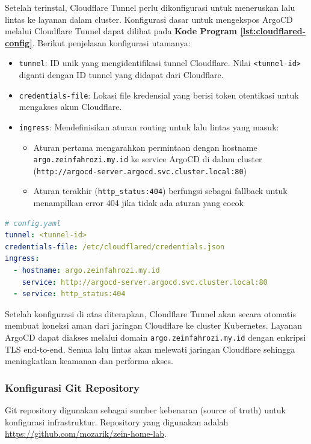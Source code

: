 Setelah terinstal, Cloudflare Tunnel perlu dikonfigurasi untuk meneruskan lalu
lintas ke layanan dalam cluster. Konfigurasi dasar untuk mengekspos ArgoCD
melalui Cloudflare Tunnel dapat dilihat pada \textbf{Kode Program
  \ref{lst:cloudflared-config}}. Berikut penjelasan konfigurasi utamanya:

\begin{itemize}
  \item \texttt{tunnel}: ID unik yang mengidentifikasi tunnel Cloudflare. Nilai \texttt{<tunnel-id>} diganti dengan ID tunnel yang didapat dari Cloudflare.
  \item \texttt{credentials-file}: Lokasi file kredensial yang berisi token otentikasi untuk mengakses akun Cloudflare.
  \item \texttt{ingress}: Mendefinisikan aturan routing untuk lalu lintas yang masuk:
        \begin{itemize}
          \item Aturan pertama mengarahkan permintaan dengan hostname
                \texttt{argo.zeinfahrozi.my.id} ke service ArgoCD di dalam cluster
                (\texttt{http://argocd-server.argocd.svc.cluster.local:80})
          \item Aturan terakhir (\texttt{http\_status:404}) berfungsi sebagai fallback untuk
                menampilkan error 404 jika tidak ada aturan yang cocok
        \end{itemize}
\end{itemize}

\begin{lstlisting}[language=yaml, 
  basicstyle=\footnotesize\ttfamily,
  caption={Konfigurasi dasar Cloudflare Tunnel untuk ArgoCD},
  label={lst:cloudflared-config}]
# config.yaml
tunnel: <tunnel-id>
credentials-file: /etc/cloudflared/credentials.json
ingress:
  - hostname: argo.zeinfahrozi.my.id
    service: http://argocd-server.argocd.svc.cluster.local:80
  - service: http_status:404
\end{lstlisting}

Setelah konfigurasi di atas diterapkan, Cloudflare Tunnel akan secara otomatis
membuat koneksi aman dari jaringan Cloudflare ke cluster Kubernetes. Layanan
ArgoCD dapat diakses melalui domain \texttt{argo.zeinfahrozi.my.id} dengan
enkripsi TLS end-to-end. Semua lalu lintas akan melewati jaringan Cloudflare
sehingga meningkatkan keamanan dan performa akses.

\subsubsection{Konfigurasi Git Repository}\label{subsec:konfigurasi_git_repository}
Git repository digunakan sebagai sumber kebenaran (source of truth) untuk
konfigurasi infrastruktur. Repository yang digunakan adalah
\url{https://github.com/mozarik/zein-home-lab}.

